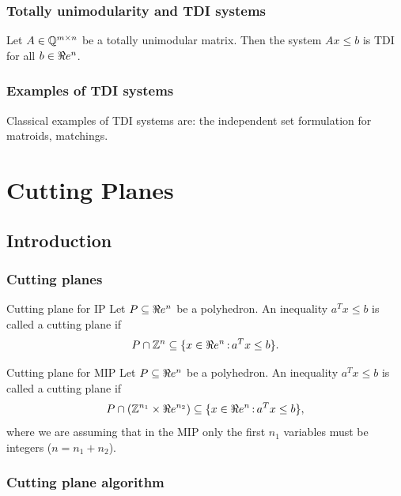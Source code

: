 \subsection{Totally unimodularity and TDI systems}

\begin{theorem}{}{}
Let $A\in{\mathbb{Q}}^{m\times n}$ be a totally unimodular matrix. Then the system $Ax\leq b$ is TDI for all $b\in\Re e^{n}$.
\end{theorem}

\subsection{Examples of TDI systems}

Classical examples of TDI systems are: the independent set formulation for matroids, matchings.



\chapter{Cutting Planes}
\section{Introduction}

\subsection{Cutting planes}
 
\begin{definition}{Cutting plane for IP}{} Let $P\subseteq\Re e^n$ be a polyhedron. An inequality $a^Tx\leq b$ is called a cutting plane if 
$$P\cap{\mathbb{Z}}^n\subseteq \{x\in\Re e^n{\,:\,} a^Tx\leq b\}.$$
\end{definition}

\begin{definition}{Cutting plane for MIP}{} Let $P\subseteq\Re e^n$ be a polyhedron. An inequality $a^Tx\leq b$ is called a cutting plane if 
$$P\cap({\mathbb{Z}}^{n_1}\times\Re e^{n_2} ) \subseteq \{x\in\Re e^n{\,:\,} a^Tx\leq b\},$$
where we are assuming that in the MIP only the first $n_1$ variables must be integers ($n=n_1+n_2$).
\end{definition}

\subsection{Cutting plane algorithm}

